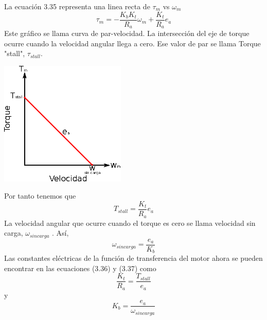 La ecuación 3.35 representa una linea recta de $\tau_m$ vs $\omega_m$
\begin{equation}
	\tau_m = -\frac{K_bK_t}{R_a} \omega_m + \frac{K_t}{R_a}e_a
\end{equation}
Este gráfico se llama curva de par-velocidad. La intersección del eje de torque ocurre cuando la velocidad angular llega a cero.
Ese valor de par se llama Torque "stall", $\tau_{stall}$.
\begin{center}
	\includegraphics[width=0.45\textwidth]{Contenido/Cuerpo/Capitulo3/Fig19.eps}
	\label{fig:ModeloMat:Fig1}
\end{center}
Por tanto tenemos que
\begin{equation}
	T_{stall} = \frac{K_t}{R_a}e_a
\end{equation}
La velocidad angular que ocurre cuando el torque es cero se llama velocidad sin carga, $\omega_{sin carga}$ . Así,
\begin{equation}
	\omega_{sin carga} = \frac{e_a}{K_b}
\end{equation}
Las constantes eléctricas de la función de transferencia del motor ahora se pueden encontrar en las ecuaciones (3.36) y (3.37) como
\begin{equation}
	\frac{K_t}{R_a} = \frac{T_{stall}}{e_a}
\end{equation}
y
\begin{equation}
	K_b = \frac{e_a}{\omega_{sincarga}}
\end{equation}